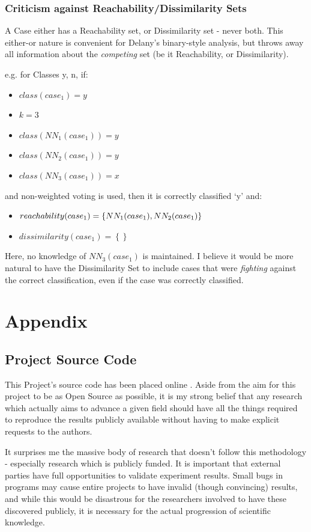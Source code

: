 \documentclass[a4paper,11pt]{report}
\begin{document}
\subsection{Criticism against Reachability/Dissimilarity Sets}
A Case either has a Reachability set, or Dissimilarity set - never both. This either-or nature is convenient for Delany's binary-style analysis, but throws away all information about the \emph{competing} set (be it Reachability, or Dissimilarity).

e.g. for Classes {y, n}, if:
\begin{itemize}
	\item $class(case_{1})=y$ 
	\item $k = 3$
	\item $class(NN_{1}(case_{1})) = y$ 
	\item $class(NN_{2}(case_{1})) = y$
	\item $class(NN_{3}(case_{1})) = x$  
\end{itemize}
and non-weighted voting is used, then it is correctly classified `y' and:
\begin{itemize}
	\item $reachability(case_{1})=\left\{ NN_{1}(case_{1}),\hphantom{}NN_{2}(case_{1})\right\} $
	\item $dissimilarity(case_{1})=\left\{ \right\} $
\end{itemize}

Here, no knowledge of $NN_{3}(case_{1})$ is maintained. I believe it would be more natural to have the Dissimilarity Set to include cases that were \emph{fighting} against the correct classification, even if the case was correctly classified.


\chapter{Appendix}
\section{Project Source Code}
This Project's source code has been placed online \citep{web:projectsourcecode}. Aside from the aim for this project to be as Open Source as possible, it is my strong belief that any research which actually aims to advance a given field should have all the things required to reproduce the results publicly available without having to make explicit requests to the authors. 

It surprises me the massive body of research that doesn't follow this methodology - especially research which is publicly funded. It is important that external parties have full opportunities to validate experiment results. Small bugs in programs may cause entire projects to have invalid (though convincing) results, and while this would be disastrous for the researchers involved to have these discovered publicly, it is necessary for the actual progression of scientific knowledge.
\end{document}
